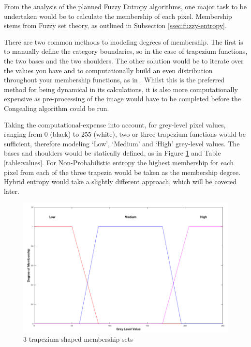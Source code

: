 From the analysis of the planned Fuzzy Entropy algorithms, one major task to be undertaken would be to calculate the membership of each pixel. Membership stems from Fuzzy set theory, as outlined in Subsection \ref{ssec:fuzzy-entropy}.

There are two common methods to modeling degrees of membership. The first is to manually define the category boundaries, so in the case of trapezium functions, the two bases and the two shoulders. The other solution would be to iterate over the values you have and to computationally build an even distribution throughout your membership functions, as in \cite{Mac_Parthalain_Strange_2013}. Whilst this is the preferred method for being dynamical in its calculations, it is also more computationally expensive as pre-processing of the image would have to be completed before the \Gls{Congealing} algorithm could be run.

Taking the computational-expense into account, for grey-level pixel values, ranging from 0 (black) to 255 (white), two or three trapezium functions would be sufficient, therefore modeling `Low', `Medium' and `High' grey-level values. The bases and shoulders would be statically defined, as in Figure \ref{fig:3-trapeziums} and Table \ref{table:values}. For Non-Probabilistic entropy the highest membership for each pixel from each of the three trapezia would be taken as the membership degree. Hybrid entropy would take a slightly different approach, which will be covered later.

\begin{figure}[H]
  \center
  \includegraphics[scale=0.4]{Chapter2/hybrid-img/3_traps.png}
  \caption{3 trapezium-shaped membership sets}
  \label{fig:3-trapeziums}
\end{figure}

